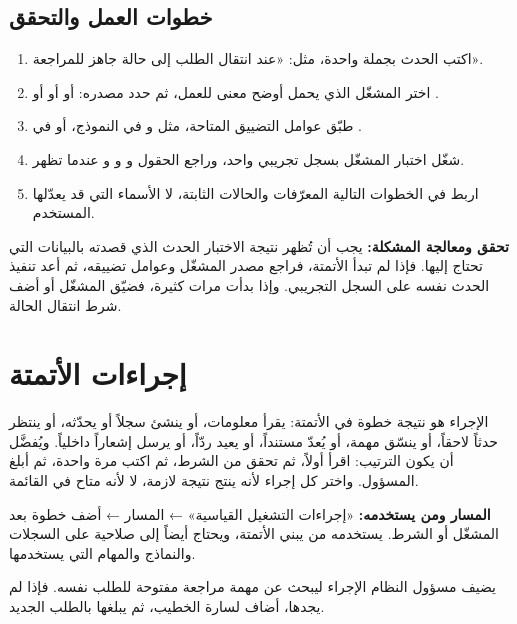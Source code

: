 \subsection{خطوات العمل والتحقق}
\begin{enumerate}
\item اكتب الحدث بجملة واحدة، مثل: «عند انتقال الطلب إلى حالة جاهز للمراجعة».
\item اختر المشغّل الذي يحمل أوضح معنى للعمل، ثم حدد مصدره:  أو  أو  أو .
\item طبّق عوامل التضييق المتاحة، مثل  و في النموذج، أو  في .
\item شغّل اختبار المشغّل بسجل تجريبي واحد، وراجع الحقول  و و و عندما تظهر.
\item اربط في الخطوات التالية المعرّفات والحالات الثابتة، لا الأسماء التي قد يعدّلها المستخدم.
\end{enumerate}

\textbf{تحقق ومعالجة المشكلة:} يجب أن تُظهر نتيجة الاختبار الحدث الذي قصدته بالبيانات التي تحتاج إليها. فإذا لم تبدأ الأتمتة، فراجع مصدر المشغّل وعوامل تضييقه، ثم أعد تنفيذ الحدث نفسه على السجل التجريبي. وإذا بدأت مرات كثيرة، فضيّق المشغّل أو أضف شرط انتقال الحالة.

\clearpage
\section{إجراءات الأتمتة}
\label{sec:builder-feature-sops-actions}

الإجراء هو نتيجة خطوة في الأتمتة: يقرأ معلومات، أو ينشئ سجلاً أو يحدّثه، أو ينتظر حدثاً لاحقاً، أو ينسّق مهمة، أو يُعدّ مستنداً، أو يعيد ردّاً، أو يرسل إشعاراً داخلياً. ويُفضَّل أن يكون الترتيب: اقرأ أولاً، ثم تحقق من الشرط، ثم اكتب مرة واحدة، ثم أبلغ المسؤول. واختر كل إجراء لأنه ينتج نتيجة لازمة، لا لأنه متاح في القائمة.

\textbf{المسار ومن يستخدمه:} «إجراءات التشغيل القياسية» ← المسار ← أضف خطوة بعد المشغّل أو الشرط. يستخدمه من يبني الأتمتة، ويحتاج أيضاً إلى صلاحية على السجلات والنماذج والمهام التي يستخدمها.

\begin{rcnote}
يضيف مسؤول النظام الإجراء  ليبحث عن مهمة مراجعة مفتوحة للطلب نفسه. فإذا لم يجدها، أضاف  لسارة الخطيب، ثم  يبلغها بالطلب الجديد.
\end{rcnote}

